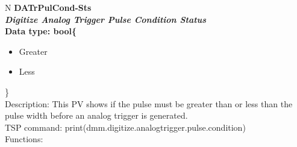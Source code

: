 \documentclass[openany]{article}
\begin{document}
		\begin{tabular}{N}
			\hline
			\bfseries DATrPulCond-Sts\label{pv:datrpulcond-sts} \\ \hline
			\emph{Digitize Analog Trigger Pulse Condition Status} \\
			Data type: bool\{\begin{itemize}[noitemsep]
				\small
				\item[] Greater
				\item[] Less
			\end{itemize}\} \\
			Description: This PV shows if the pulse must be greater than or less than the pulse width before an analog trigger is generated. \\
			TSP command: print(dmm.digitize.analogtrigger.pulse.condition) \\
			Functions: \\
			\arrayrulecolor{\FuncTableBorderColor}

		\end{tabular}
\end{document}
